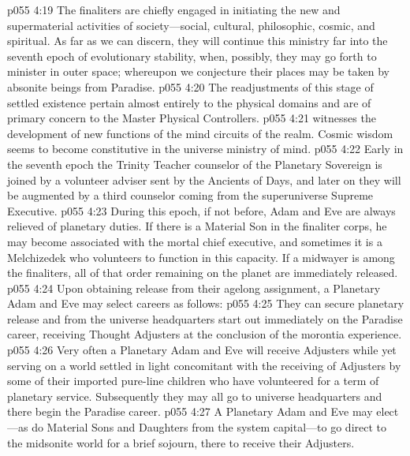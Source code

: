 \vs p055 4:19 The finaliters are chiefly engaged in initiating the new and supermaterial activities of society---social, cultural, philosophic, cosmic, and spiritual. As far as we can discern, they will continue this ministry far into the seventh epoch of evolutionary stability, when, possibly, they may go forth to minister in outer space; whereupon we conjecture their places may be taken by absonite beings from Paradise.
\pc \vs p055 4:20 \bibnobreakspace {} The readjustments of this stage of settled existence pertain almost entirely to the physical domains and are of primary concern to the Master Physical Controllers.
\pc \vs p055 4:21 \bibnobreakspace {} witnesses the development of new functions of the mind circuits of the realm. Cosmic wisdom seems to become constitutive in the universe ministry of mind.
\pc \vs p055 4:22 \bibnobreakspace {} Early in the seventh epoch the Trinity Teacher counselor of the Planetary Sovereign is joined by a volunteer adviser sent by the Ancients of Days, and later on they will be augmented by a third counselor coming from the superuniverse Supreme Executive.
\vs p055 4:23 During this epoch, if not before, Adam and Eve are always relieved of planetary duties. If there is a Material Son in the finaliter corps, he may become associated with the mortal chief executive, and sometimes it is a Melchizedek who volunteers to function in this capacity. If a midwayer is among the finaliters, all of that order remaining on the planet are immediately released.
\pc \vs p055 4:24 Upon obtaining release from their agelong assignment, a Planetary Adam and Eve may select careers as follows:
\pc \vs p055 4:25 \bibnobreakspace They can secure planetary release and from the universe headquarters start out immediately on the Paradise career, receiving Thought Adjusters at the conclusion of the morontia experience.
\pc \vs p055 4:26 \bibnobreakspace Very often a Planetary Adam and Eve will receive Adjusters while yet serving on a world settled in light concomitant with the receiving of Adjusters by some of their imported pure\hyp{}line children who have volunteered for a term of planetary service. Subsequently they may all go to universe headquarters and there begin the Paradise career.
\pc \vs p055 4:27 \bibnobreakspace A Planetary Adam and Eve may elect---as do Material Sons and Daughters from the system capital---to go direct to the midsonite world for a brief sojourn, there to receive their Adjusters.
